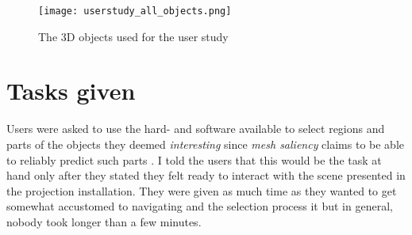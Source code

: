 \begin{figure}[htb]
  \centering
  \texttt{[image: userstudy\_all\_objects.png]}\\ %
  \caption{The 3D objects used for the user study}\label{fig:all_objects}
\end{figure}

	\section{Tasks given}
	\label{sec:tasks_given}
%
%

Users were asked to use the hard- and software available to select regions and parts of the objects they deemed \textit{interesting} since \textit{mesh saliency} claims to be able to reliably predict such parts \cite{lee2005mesh}. I told the users that this would be the task at hand only after they stated they felt ready to interact with the scene presented in the projection installation. They were given as much time as they wanted to get somewhat accustomed to navigating and the selection process it but in general, nobody took longer than a few minutes.

